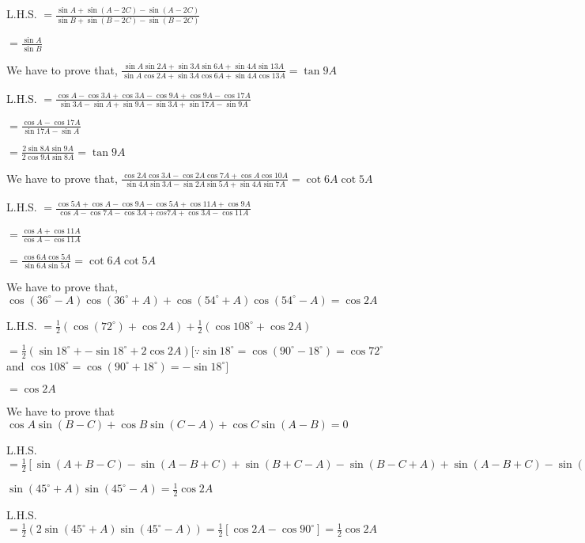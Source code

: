   L.H.S. $= \frac{\sin A + \sin(A - 2C) - \sin(A - 2C)}{\sin B + \sin(B - 2C) - \sin(B - 2C)}$

  $= \frac{\sin A}{\sin B}$

\item We have to prove that, $\frac{\sin A\sin 2A + \sin 3A\sin 6A + \sin4A\sin 13A}{\sin A\cos2A + \sin 3A\cos 6A + \sin
  4A\cos 13A} = \tan 9A$

  L.H.S. $= \frac{\cos A - \cos 3A + \cos 3A - \cos 9A + \cos 9A - \cos 17A}{\sin 3A - \sin A + \sin 9A - \sin 3A + \sin 17A
    - \sin 9A}$

  $= \frac{\cos A - \cos 17A}{\sin 17A - \sin A}$

  $= \frac{2\sin 8A\sin 9A}{2\cos 9A\sin 8A} = \tan 9A$

\item We have to prove that, $\frac{\cos 2A\cos 3A - \cos 2A\cos 7A + \cos A\cos 10A}{\sin 4A\sin 3A - \sin 2A\sin 5A + \sin
  4A\sin 7A} =\cot 6A\cot 5A$

  L.H.S. $= \frac{\cos 5A + \cos A - \cos 9A - \cos 5A + \cos 11A + \cos 9A}{\cos A - \cos 7A - \cos 3A + cos 7A + \cos
    3A - \cos 11A}$

  $= \frac{\cos A + \cos 11A}{\cos A - \cos 11A}$

  $= \frac{\cos 6A\cos 5A}{\sin 6A\sin 5A} = \cot 6A\cot 5A$

\item We have to prove that, $\cos(36^\circ - A)\cos(36^\circ + A) + \cos(54^\circ + A)\cos(54^\circ - A) = \cos 2A$

  L.H.S. $= \frac{1}{2}(\cos (72^\circ)+ \cos 2A) + \frac{1}{2}(\cos 108^\circ + \cos 2A)$

  $= \frac{1}{2}(\sin 18^\circ + - \sin 18^\circ + 2\cos 2A)[\because \sin 18^\circ = \cos(90^\circ - 18^\circ) = \cos
    72^\circ$ and $\cos 108^\circ = \cos(90^\circ + 18^\circ) = -\sin 18^\circ]$

  $= \cos 2A$

\item We have to prove that $\cos A\sin(B - C) + \cos B\sin(C - A) + \cos C\sin(A - B) = 0$

  L.H.S. $= \frac{1}{2}[\sin(A + B - C) - \sin(A - B + C) + \sin(B + C - A) - \sin (B - C + A) + \sin(A - B + C) - \sin(C -
    A + B)] = 0$

\item $\sin(45^\circ + A)\sin(45^\circ - A) = \frac{1}{2}\cos 2A$

  L.H.S. $= \frac{1}{2}(2\sin(45^\circ + A)\sin(45^\circ - A)) = \frac{1}{2}[\cos 2A - \cos 90^\circ] = \frac{1}{2}\cos 2A$

